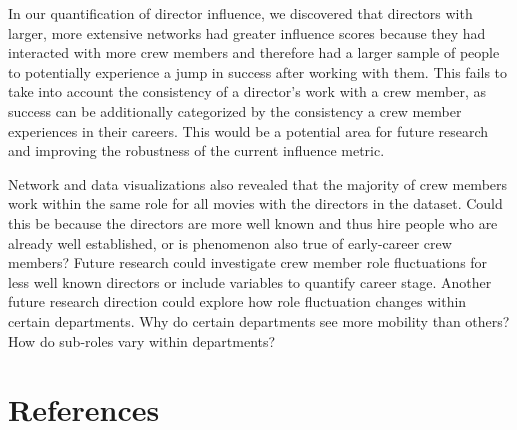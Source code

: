 \documentclass[12pt]{article}
\begin{document}
In our quantification of director influence, we discovered that directors with larger, more extensive networks had greater influence scores because they had interacted with more crew members and therefore had a larger sample of people to potentially experience a jump in success after working with them. This fails to take into account the consistency of a director's work with a crew member, as success can be additionally categorized by the consistency a crew member experiences in their careers.  This would be a potential area for future research and improving the robustness of the current influence metric.

Network and data visualizations also revealed that the majority of crew members work within the same role for all movies with the directors in the dataset. Could this be because the directors are more well known and thus hire people who are already well established, or is phenomenon also true of early-career crew members? 
Future research could investigate crew member role fluctuations for less well known directors or include variables to quantify career stage. Another future research direction could explore how role fluctuation changes within certain departments. Why do certain departments see more mobility than others? How do sub-roles vary within departments? 




\section*{References}
\end{document}
